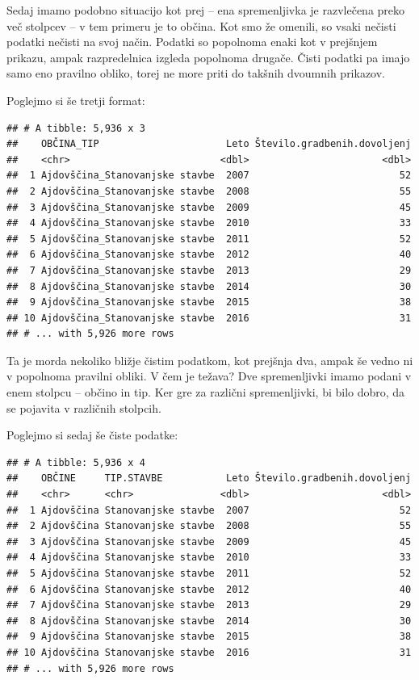 \documentclass[
]{book}
\begin{document}
Sedaj imamo podobno situacijo kot prej -- ena spremenljivka je razvlečena preko več stolpcev -- v tem primeru je to občina. Kot smo že omenili, so vsaki nečisti podatki nečisti na svoj način. Podatki so popolnoma enaki kot v prejšnjem prikazu, ampak razpredelnica izgleda popolnoma drugače. Čisti podatki pa imajo samo eno pravilno obliko, torej ne more priti do takšnih dvoumnih prikazov.

Poglejmo si še tretji format:

\begin{verbatim}
## # A tibble: 5,936 x 3
##    OBČINA_TIP                      Leto Število.gradbenih.dovoljenj
##    <chr>                          <dbl>                       <dbl>
##  1 Ajdovščina_Stanovanjske stavbe  2007                          52
##  2 Ajdovščina_Stanovanjske stavbe  2008                          55
##  3 Ajdovščina_Stanovanjske stavbe  2009                          45
##  4 Ajdovščina_Stanovanjske stavbe  2010                          33
##  5 Ajdovščina_Stanovanjske stavbe  2011                          52
##  6 Ajdovščina_Stanovanjske stavbe  2012                          40
##  7 Ajdovščina_Stanovanjske stavbe  2013                          29
##  8 Ajdovščina_Stanovanjske stavbe  2014                          30
##  9 Ajdovščina_Stanovanjske stavbe  2015                          38
## 10 Ajdovščina_Stanovanjske stavbe  2016                          31
## # ... with 5,926 more rows
\end{verbatim}

Ta je morda nekoliko bližje čistim podatkom, kot prejšnja dva, ampak še vedno ni v popolnoma pravilni obliki. V čem je težava? Dve spremenljivki imamo podani v enem stolpcu -- občino in tip. Ker gre za različni spremenljivki, bi bilo dobro, da se pojavita v različnih stolpcih.

Poglejmo si sedaj še čiste podatke:

\begin{verbatim}
## # A tibble: 5,936 x 4
##    OBČINE     TIP.STAVBE           Leto Število.gradbenih.dovoljenj
##    <chr>      <chr>               <dbl>                       <dbl>
##  1 Ajdovščina Stanovanjske stavbe  2007                          52
##  2 Ajdovščina Stanovanjske stavbe  2008                          55
##  3 Ajdovščina Stanovanjske stavbe  2009                          45
##  4 Ajdovščina Stanovanjske stavbe  2010                          33
##  5 Ajdovščina Stanovanjske stavbe  2011                          52
##  6 Ajdovščina Stanovanjske stavbe  2012                          40
##  7 Ajdovščina Stanovanjske stavbe  2013                          29
##  8 Ajdovščina Stanovanjske stavbe  2014                          30
##  9 Ajdovščina Stanovanjske stavbe  2015                          38
## 10 Ajdovščina Stanovanjske stavbe  2016                          31
## # ... with 5,926 more rows
\end{verbatim}
\end{document}
